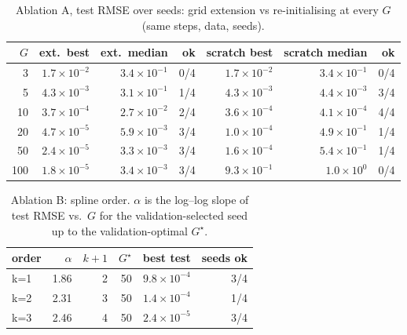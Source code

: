 \begin{table}[t]
\caption{Ablation A, test RMSE over seeds: grid extension vs re-initialising at every $G$ (same steps, data, seeds).}\label{tab:ablA}
\centering\footnotesize
\begin{tabular}{rrrrrrr}
\toprule
$G$ & ext.\ best & ext.\ median & ok & scratch best & scratch median & ok \\
\midrule
3 & $1.7\!\times\!10^{-2}$ & $3.4\!\times\!10^{-1}$ & 0/4 & $1.7\!\times\!10^{-2}$ & $3.4\!\times\!10^{-1}$ & 0/4 \\
5 & $4.3\!\times\!10^{-3}$ & $3.1\!\times\!10^{-1}$ & 1/4 & $4.3\!\times\!10^{-3}$ & $4.4\!\times\!10^{-3}$ & 3/4 \\
10 & $3.7\!\times\!10^{-4}$ & $2.7\!\times\!10^{-2}$ & 2/4 & $3.6\!\times\!10^{-4}$ & $4.1\!\times\!10^{-4}$ & 4/4 \\
20 & $4.7\!\times\!10^{-5}$ & $5.9\!\times\!10^{-3}$ & 3/4 & $1.0\!\times\!10^{-4}$ & $4.9\!\times\!10^{-1}$ & 1/4 \\
50 & $2.4\!\times\!10^{-5}$ & $3.3\!\times\!10^{-3}$ & 3/4 & $1.6\!\times\!10^{-4}$ & $5.4\!\times\!10^{-1}$ & 1/4 \\
100 & $1.8\!\times\!10^{-5}$ & $3.4\!\times\!10^{-3}$ & 3/4 & $9.3\!\times\!10^{-1}$ & $1.0\!\times\!10^{0}$ & 0/4 \\
\bottomrule
\end{tabular}
\end{table}

\begin{table}[t]
\caption{Ablation B: spline order. $\alpha$ is the log--log slope of test RMSE vs.\ $G$ for the validation-selected seed up to the validation-optimal $G^\star$.}\label{tab:ablB}
\centering\footnotesize
\begin{tabular}{lrrrrr}
\toprule
order & $\alpha$ & $k{+}1$ & $G^\star$ & best test & seeds ok \\
\midrule
k=1 & 1.86 & 2 & 50 & $9.8\!\times\!10^{-4}$ & 3/4 \\
k=2 & 2.31 & 3 & 50 & $1.4\!\times\!10^{-4}$ & 1/4 \\
k=3 & 2.46 & 4 & 50 & $2.4\!\times\!10^{-5}$ & 3/4 \\
\bottomrule
\end{tabular}
\end{table}
